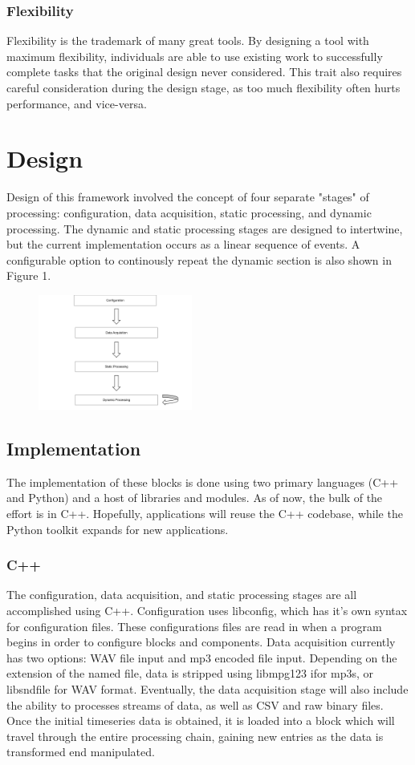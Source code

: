 \documentclass[journal]{IEEEtran}
\begin{document}
\subsubsection{Flexibility}
Flexibility is the trademark of many great tools. By designing a tool with maximum flexibility, individuals are able to use existing 
work to successfully complete tasks that the original design never considered. This trait also requires careful consideration during the design
stage, as too much flexibility often hurts performance, and vice-versa.

\section{Design}
Design of this framework involved the concept of four separate "stages" of processing: configuration, data acquisition, static processing, and 
dynamic processing. The dynamic and static processing stages are designed to intertwine, but the current implementation occurs as a 
linear sequence of events. A configurable option to continously repeat the dynamic section is also shown in Figure 1.
\begin{figure}[h!]
\centering
  \includegraphics[width=0.45\textwidth]{fig1.png}
\end{figure}

\subsection{Implementation}
The implementation of these blocks is done using two primary languages (C++ and Python) and a host of libraries and modules. As of now, the bulk
of the effort is in C++. Hopefully, applications will reuse the C++ codebase, while the Python toolkit expands for new applications.

\subsubsection{C++}
The configuration, data acquisition, and static processing stages are all accomplished using C++. Configuration uses libconfig, which 
has it's own syntax for configuration files. These configurations files are read in when a program begins in order to configure blocks and 
components. Data acquisition currently has two options: WAV file input and mp3 encoded file input. Depending on the extension of the named file, 
data is stripped using libmpg123 ifor mp3s, or libsndfile for WAV format. Eventually, the data acquisition stage will also include the ability to processes streams of data, as well as CSV and raw binary files. Once the initial timeseries data is obtained, it is loaded into a block which will travel through the entire processing chain, gaining new entries as the data is transformed end manipulated. 
\end{document}

